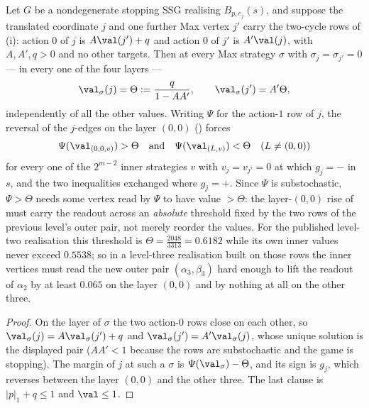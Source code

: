 \begin{proposition}\label{b3:theta-floor}
Let $G$ be a nondegenerate stopping SSG realising $B_{p,e_{j}}(s)$, and suppose
the translated coordinate $j$ and one further Max vertex $j'$ carry the
two-cycle rows of (i): action $0$ of $j$ is
$A\val(j')+q$ and action $0$ of $j'$ is $A'\val(j)$, with $A,A',q>0$ and no
other targets. Then at every Max strategy $\sigma$ with
$\sigma_{j}=\sigma_{j'}=0$ --- in every one of the four layers ---
\[
  \val_\sigma(j)=\Theta:=\frac{q}{1-AA'},\qquad \val_\sigma(j')=A'\Theta ,
\]
independently of all the other values. Writing $\Psi$ for the action-$1$ row of
$j$, the reversal of the $j$-edges on the layer $(0,0)$ ()
forces
\[
 \Psi(\val_{(0,0,v)})>\Theta \quad\text{and}\quad \Psi(\val_{(L,v)})<\Theta
 \quad (L\ne(0,0))
\]
for every one of the $2^{m-2}$ inner strategies $v$ with $v_j=v_{j'}=0$ at
which $g_j=-$ in $s$, and the two inequalities exchanged where $g_j=+$. Since
$\Psi$ is substochastic, $\Psi>\Theta$ needs some vertex read by $\Psi$ to have
value $>\Theta$: the layer-$(0,0)$ rise of  must carry the
readout across an \emph{absolute} threshold fixed by the two rows of the
previous level's outer pair, not merely reorder the values. For the published
level-two realisation this threshold is $\Theta=\tfrac{2048}{3313}=0.6182$
while its own inner values never exceed $0.5538$; so in a level-three
realisation built on those rows the inner vertices must read the new outer pair
$(\alpha_3,\beta_3)$ hard enough to lift the readout of $\alpha_2$ by at least
$0.065$ on the layer $(0,0)$ and by nothing at all on the other three.
\end{proposition}

\begin{proof}
On the layer of $\sigma$ the two action-$0$ rows close on each other, so
$\val_\sigma(j)=A\val_\sigma(j')+q$ and $\val_\sigma(j')=A'\val_\sigma(j)$,
whose unique solution is the displayed pair ($AA'<1$ because the rows are
substochastic and the game is stopping). The margin of $j$ at such a $\sigma$
is $\Psi(\val_\sigma)-\Theta$, and its sign is $g_j$, which
 reverses between the layer $(0,0)$ and the other three.
The last clause is $|p|_1+q\le1$ and $\val\le1$.
\end{proof}

